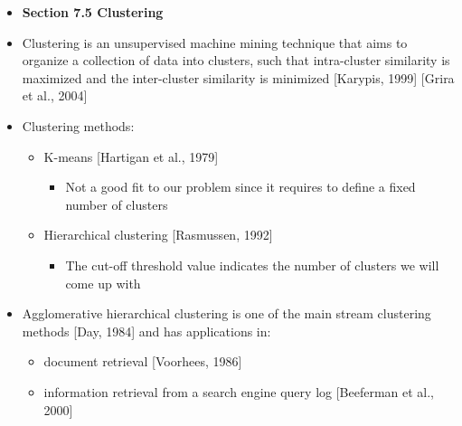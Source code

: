 \documentclass{article}
\newcommand{\bold}{\textbf}
\begin{document}
\begin{itemize} [leftmargin=.1in]
\item \bold{Section 7.5 Clustering}
\item Clustering is an unsupervised machine mining technique that aims to organize a collection of data into clusters, such that intra-cluster similarity is maximized and the inter-cluster similarity is minimized [Karypis, 1999] [Grira et al., 2004]
\item Clustering methods:
\begin{itemize}
\item K-means [Hartigan et al., 1979]
\begin{itemize}
\item Not a good fit to our problem since it requires to define a fixed number of clusters
\end{itemize}
\item Hierarchical clustering [Rasmussen, 1992]
\begin{itemize}
\item The cut-off threshold value indicates the number of clusters we will come up with
\end{itemize}
\end{itemize}
\item Agglomerative hierarchical clustering is one of the main stream clustering methods [Day, 1984] and has applications in:
\begin{itemize}
\item document retrieval [Voorhees, 1986]
\item information retrieval from a search engine query log [Beeferman et al., 2000]
\end{itemize}


\end{itemize}
\end{document}
